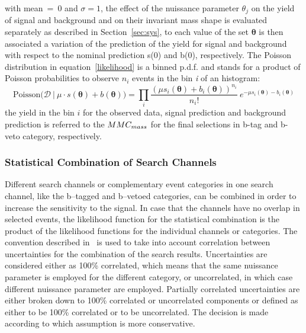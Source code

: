  with mean~=~0 and $\sigma = 1$,  the effect of the nuissance parameter $\theta_j$ on the yield
of signal and background and on their invariant mass shape is evaluated separately as described in Section~\ref{sec:sys}, 
to each value of the set $\boldsymbol{\theta}$ is then associated a variation of the prediction of the yield for signal and background
with respect to the nominal prediction s(0) and b(0), respectively.
The Poisson distribution in equation~\eqref{likelihood} is a binned p.d.f. and 
stands for a product of Poisson probabilities to observe $n_i$ events in the bin \textit{i} of an histogram:
$$
 \text{Poisson(}\mathcal{D} ~ | ~ \mu \cdot s(\boldsymbol{\theta}) + b(\boldsymbol{\theta})) = \prod_{i} \frac{(\mu s_i(\boldsymbol{\theta}) +b_i(\boldsymbol{\theta}))^{n_i}}{n_i!} ~ e^{-\mu s_i(\boldsymbol{\theta})
 -b_i(\boldsymbol{\theta})}
$$
the yield in the bin $i$ for the observed data, signal prediction and background prediction is referred to the $MMC_{mass}$ 
for the final selections in b-tag and b-veto category, respectively.

\subsubsection{Statistical Combination of Search Channels}
Different search channels or complementary event categories in one search channel, like the b–tagged and b–vetoed categories, 
can be combined in order to increase the
sensitivity to the signal. In case that the channels have no overlap in selected events, the
likelihood function for the statistical combination is the product of the likelihood
functions for the individual channels or categories. The  convention described in~\cite{lhclimits} is used
to take into account correlation between uncertainties for the combination of the search results.
Uncertainties are considered either as 100\% correlated, which means that the same nuissance parameter
is employed for the different category,  or uncorrelated, in which case different nuissance parameter are
employed. Partially correlated uncertainties are either broken down to 100\% correlated or uncorrelated components or
defined as either to be 100\% correlated or to be uncorrelated. The decision is made according to which 
assumption is more conservative. 

